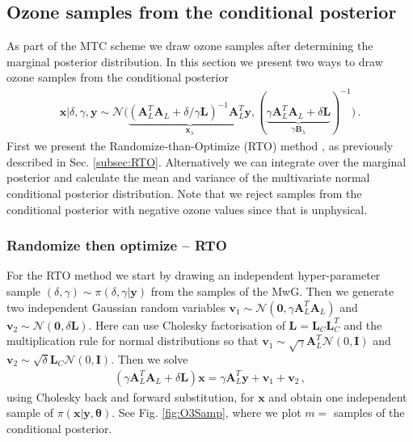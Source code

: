 \subsection{Ozone samples from the conditional posterior}
\label{subsec:firstCond}
As part of the MTC scheme we draw ozone samples after determining the marginal posterior distribution.
In this section we present two ways to draw ozone samples from the conditional posterior
\begin{align}
	\bm{x}| \delta, \gamma, \bm{y}  \sim \mathcal{N}\big( \underbrace{ (\bm{A}_L^T \bm{A}_L + \delta / \gamma \bm{L} )^{-1} \bm{A}_L^T \bm{y}}_{\bm{x}_{\lambda}}, ( \underbrace{ \gamma \bm{A}_L^T \bm{A}_L + \delta \bm{L} }_{\gamma \bm{B}_{\lambda}}  )^{-1} \big) \, \label{eq:CondPost}.
\end{align}
First we present the Randomize-than-Optimize (RTO) method \cite{bardsley2012mcmc,bardsley2015randomize, fox2016fast}, as previously described in Sec. \ref{subsec:RTO}.
Alternatively we can integrate over the marginal posterior and calculate the mean and variance of the multivariate normal conditional posterior distribution.
Note that we reject samples from the conditional posterior with negative ozone values since that is unphysical.

\subsubsection{Randomize then optimize -- RTO}
For the RTO method we start by drawing an independent hyper-parameter sample $ ( \delta, \gamma) \sim \pi(\delta, \gamma | \bm{y})$ from the samples of the MwG.
Then we generate two independent Gaussian random variables $\bm{v}_1 \sim \mathcal{N}(\bm{0},\gamma  \bm{A}^T_L \bm{A}_L)$ and $\bm{v}_2 \sim \mathcal{N}(\bm{0}, \delta \bm{L})$.
Here  can use Cholesky factorisation of $\bm{L} =\bm{L}_C\bm{L}^T_C $ and the multiplication rule for normal distributions so that $\bm{v}_1 \sim \sqrt{\gamma} \bm{A}_L^T \mathcal{N}(0,\bm{I})$ and $\bm{v}_2 \sim \sqrt{\delta} \bm{L}_C \mathcal{N}(0,\bm{I})$.
Then we solve
\begin{align}
	\label{eq:FirstRTO}
	\left( \gamma \bm{A}_L^T  \bm{A}_L +\delta \bm{L} \right) \bm{x} = \gamma \bm{A}_L^T \bm{y} + \bm{v}_1 + \bm{v}_2 \, ,
\end{align}
using Cholesky back and forward substitution, for $\bm{x}$ and obtain one independent sample of $\pi(\bm{x}|\bm{y}, \bm{\theta})$.
See Fig. \ref{fig:O3Samp}, where we plot $m = $ samples of the conditional posterior.

